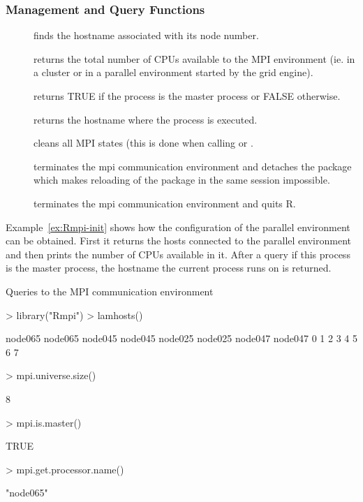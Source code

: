 \subsubsection{Management and Query Functions}

\begin{description}
\item[] finds the hostname associated with its node
  number.
\item[] returns the total number of CPUs
  available to the MPI environment (ie. in a cluster or in a parallel
  environment started by the grid engine).
\item[] returns TRUE if the process is the
  master process or FALSE otherwise. 
\item[] returns the hostname where the
  process is executed.
\item[] cleans all MPI states (this is done when
  calling  or .
\item[] terminates the mpi communication
  environment and detaches the  package which makes reloading of
  the package  in the same session impossible.  
\item[] terminates the mpi communication
  environment and quits R.  
\end{description}

Example~\ref{ex:Rmpi-init} shows how the configuration of the
parallel environment can be obtained. First it returns the hosts
connected to the parallel environment and then prints the number of
CPUs available in it. After a query if this process is the master
process, the hostname the current process runs on is
returned. 

\begin{Example} Queries to the MPI communication environment
\label{ex:Rmpi-init}
\begin{Schunk}
\begin{Sinput}
> library("Rmpi")
> lamhosts()
\end{Sinput}
\begin{Soutput}
node065 node065 node045 node045 node025 node025 node047 node047 
      0       1       2       3       4       5       6       7 
\end{Soutput}
\begin{Sinput}
> mpi.universe.size()
\end{Sinput}
\begin{Soutput}
[1] 8
\end{Soutput}
\begin{Sinput}
> mpi.is.master()
\end{Sinput}
\begin{Soutput}
[1] TRUE
\end{Soutput}
\begin{Sinput}
> mpi.get.processor.name()
\end{Sinput}
\begin{Soutput}
[1] "node065"
\end{Soutput}
\end{Schunk}
\end{Example}

